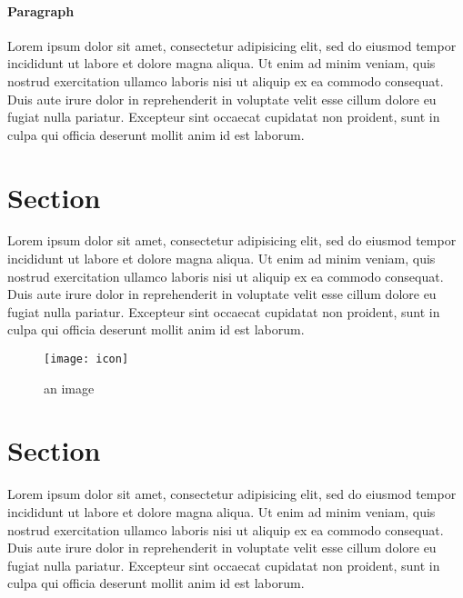 \documentclass[a5paper, 10pt]{book}
\begin{document}
	\paragraph{Paragraph} Lorem ipsum dolor sit amet, consectetur adipisicing elit, sed do eiusmod tempor incididunt ut labore et dolore magna aliqua. Ut enim ad minim veniam, quis nostrud exercitation ullamco laboris nisi ut aliquip ex ea commodo consequat. Duis aute irure dolor in reprehenderit in voluptate velit esse cillum dolore eu fugiat nulla pariatur. Excepteur sint occaecat cupidatat non proident, sunt in culpa qui officia deserunt mollit anim id est laborum.

	\section{Section}

	Lorem ipsum dolor sit amet, consectetur adipisicing elit, sed do eiusmod tempor incididunt ut labore et dolore magna aliqua. Ut enim ad minim veniam, quis nostrud exercitation ullamco laboris nisi ut aliquip ex ea commodo consequat. Duis aute irure dolor in reprehenderit in voluptate velit esse cillum dolore eu fugiat nulla pariatur. Excepteur sint occaecat cupidatat non proident, sunt in culpa qui officia deserunt mollit anim id est laborum.

	\begin{figure}
		\texttt{[image: icon]}
		\caption{an image}
	\end{figure}

	\section{Section}

	Lorem ipsum dolor sit amet, consectetur adipisicing elit, sed do eiusmod tempor incididunt ut labore et dolore magna aliqua. Ut enim ad minim veniam, quis nostrud exercitation ullamco laboris nisi ut aliquip ex ea commodo consequat. Duis aute irure dolor in reprehenderit in voluptate velit esse cillum dolore eu fugiat nulla pariatur. Excepteur sint occaecat cupidatat non proident, sunt in culpa qui officia deserunt mollit anim id est laborum.
\end{document}
